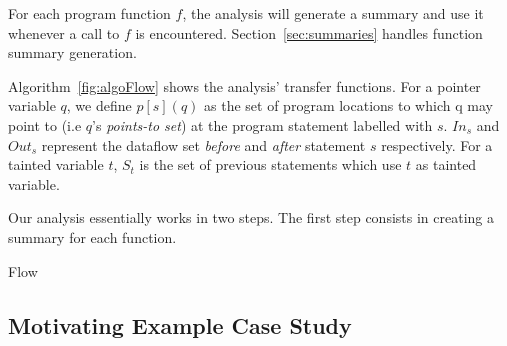 For each program function $f$,
the analysis will generate a summary and use it whenever
a call to $f$ is encountered.
Section~\ref{sec:summaries} handles function summary generation.

Algorithm~\ref{fig:algoFlow} shows the analysis' transfer functions.
For a pointer variable $q$, we define \(p[s](q)\) as the set
of program locations to which q may point to (i.e $q$'s \textit{points-to set})
at the program statement labelled with $s$.
$In_s$ and $Out_s$ represent the dataflow set \textit{before}
and \textit{after} statement $s$ respectively. 
For a tainted variable $t$, $S_t$ is the set of previous
statements which use $t$ as tainted variable.


Our analysis essentially works in two steps. The
first step consists in creating a summary for each
function.

\IncMargin{1em}
\begin{algorithm}
\caption{Flow}\label{fig:algoFlow}
\SetAlgoLined
\LinesNumbered
\DontPrintSemicolon
{}


\end{algorithm}
\DecMargin{1em}

\subsection{Motivating Example Case Study}\label{sec:sampleSummary}


